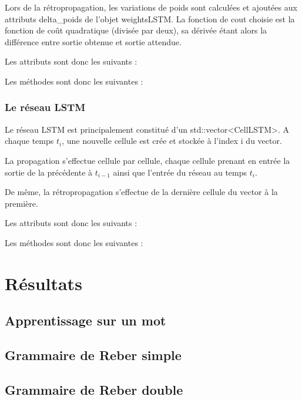 \medskip

Lors de la rétropropagation, les variations de poids sont calculées et ajoutées
aux attributs delta\_poids de l'objet weightsLSTM. La fonction de cout choisie
est la fonction de coût quadratique (divisée par deux), sa dérivée étant alors
la différence entre sortie obtenue et sortie attendue.

\bigskip

Les attributs sont donc les suivants :


Les méthodes sont donc les suivantes :


\subsubsection{Le réseau LSTM}

Le réseau LSTM est principalement constitué d'un std::vector<CellLSTM>.
A chaque temps $t_i$, une nouvelle cellule est crée et stockée à l'index i du
vector.

\medskip

La propagation s'effectue cellule par cellule, chaque cellule prenant en entrée
la sortie de la précédente à $t_{i-1}$ ainsi que l'entrée du réseau au temps
$t_i$.

\medskip

De même, la rétropropagation s'effectue de la dernière cellule du vector à
la première.

\bigskip

Les attributs sont donc les suivants :


\bigskip

Les méthodes sont donc les suivantes :


\section{Résultats}
\subsection{Apprentissage sur un mot}
\subsection{Grammaire de Reber simple}
\subsection{Grammaire de Reber double}
